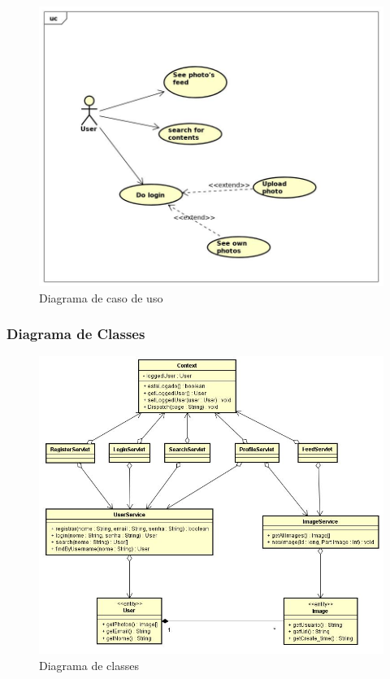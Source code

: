 \begin{figure}[ht]
	\centering
	\includegraphics[width=\textwidth]{./imagens/usecase.jpg}
	\caption{Diagrama de caso de uso}
	\label{fig:casoDeUso}
\end{figure}

\subsubsection{Diagrama de Classes}
\begin{figure}[ht]
	\centering
	\includegraphics[width=\textwidth]{./imagens/classdiagram.jpg}
	\caption{Diagrama de classes}
	\label{fig:diagramaDeClasse}
\end{figure}

